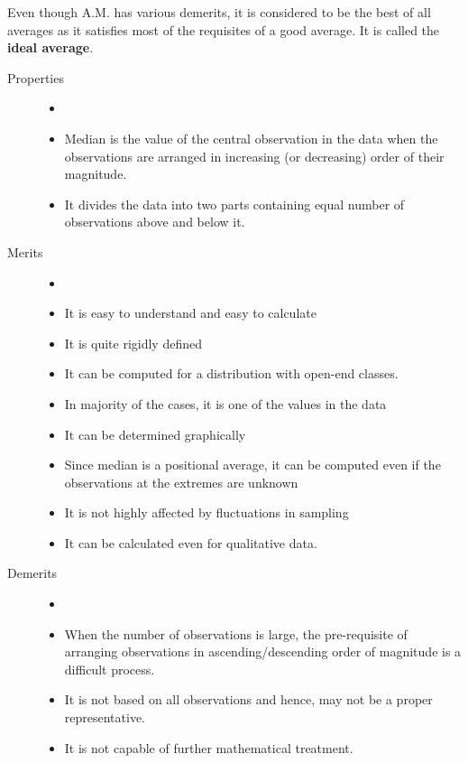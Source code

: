 \documentclass[
10pt, %
a4paper, %
]{report}
\begin{document}
\begin{description}
\begin{description}
\begin{itemize}
\end{itemize}
\item Even though A.M. has various demerits, it is considered to be the best of all averages as it satisfies most of the requisites of a good average. It is called the \textbf{ideal average}.
\end{description}
\item[Median]
\begin{description}
\item[]
\item[Properties]
\begin{itemize}
\item[]
\item Median is the value of the central observation in the data when the observations are arranged in increasing (or decreasing) order of their magnitude.
\item It divides the data into two parts containing equal number of observations above and below it.
\end{itemize}
\item[Merits]
\begin{itemize}
\item[]
\item It is easy to understand and easy to calculate
\item It is quite rigidly defined
\item It can be computed for a distribution with open-end
classes.
\item In majority of the cases, it is one of the values in the data
\item It can be determined graphically
\item Since median is a positional average, it can be computed
even if the observations at the extremes are unknown
\item It is not highly affected by fluctuations in sampling
\item It can be calculated even for qualitative data.
\end{itemize}
\item[Demerits]
\begin{itemize}
\item[]
\item When the number of observations is large, the pre-requisite of arranging observations in ascending/descending order of magnitude is a difficult process.
\item It is not based on all observations and hence, may not be a proper representative.
\item It is not capable of further mathematical treatment.

\end{itemize}
\end{description}
\end{description}
\end{document}
